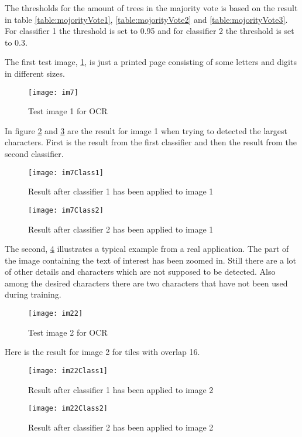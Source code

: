 The thresholds for the amount of trees in the majority vote is based on the result in table \ref{table:mojorityVote1}, \ref{table:mojorityVote2} and \ref{table:mojorityVote3}. For classifier 1 the threshold is set to 0.95 and for classifier 2 the threshold is set to 0.3.

The first test image, \ref{im7}, is just a printed page consisting of some letters and digits in different sizes.

\begin{figure}[H]
\centering
	\texttt{[image: im7]}
	\caption{Test image 1 for OCR}
	\label{im7}
\end{figure}

In figure \ref{im7res1} and \ref{im7res2} are the result for image 1 when trying to detected the largest characters. First is the result from the first classifier and then the result from the second classifier.

\begin{figure}[H]
\centering
	\texttt{[image: im7Class1]}
	\caption{Result after classifier 1 has been applied to image 1}
	\label{im7res1}
\end{figure}

\begin{figure}[H]
\centering
	\texttt{[image: im7Class2]}
	\caption{Result after classifier 2 has been applied to image 1}
	\label{im7res2}
\end{figure}

The second, \ref{im22} illustrates a typical example from a real application. The part of the image containing the text of interest has been zoomed in. Still there are a lot of other details and characters which are not supposed to be detected. Also among the desired characters there are two characters that have not been used during training.

\begin{figure}[H]
\centering
	\texttt{[image: im22]}
	\caption{Test image 2 for OCR}
	\label{im22}
\end{figure}

Here is the result for image 2 for tiles with overlap 16.

\begin{figure}[H]
\centering
	\texttt{[image: im22Class1]}
	\caption{Result after classifier 1 has been applied to image 2}
	\label{im22res1}
\end{figure}

\begin{figure}[H]
\centering
	\texttt{[image: im22Class2]}
	\caption{Result after classifier 2 has been applied to image 2}
	\label{im22res2}
\end{figure}

